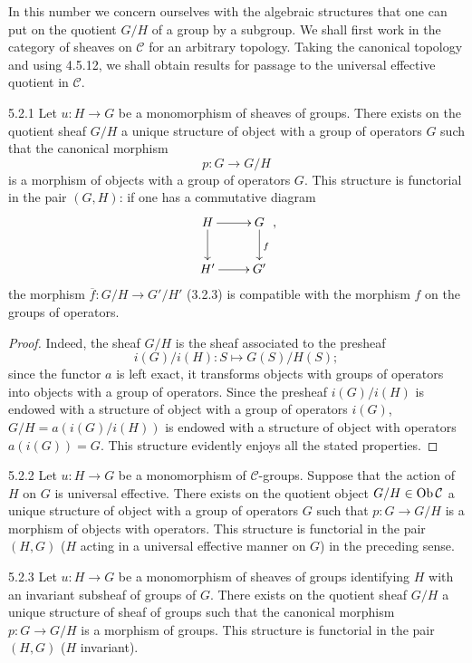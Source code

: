 In this number we concern ourselves with the algebraic
structures that one can put on the quotient \(G/H\)
of a group by a subgroup.
We shall first work in the category of sheaves on
\(\mathcal C\) for an arbitrary topology.
Taking the canonical topology and using 4.5.12,
we shall obtain results for passage to the universal
effective quotient in \(\mathcal C\).

\begin{proposition}{5.2.1}\label{IV.5.2.1}
Let \(u:H\to G\) be a monomorphism of sheaves of groups.
There exists on the quotient sheaf \(G/H\) a unique
structure of object with a group of operators \(G\)
such that the canonical morphism
\[
p:G\longrightarrow G/H
\]
is a morphism of objects with a group of operators \(G\).
This structure is functorial in the pair \((G,H)\):
if one has a commutative diagram
\[
\xymatrix{H\ar[r]\ar[d] & G\ar[d]^f\\ H'\ar[r] & G' },
\]
the morphism \(\overline f:G/H\to G'/H'\) (3.2.3)
is compatible with the morphism \(f\) on the groups
of operators.
\end{proposition}
\begin{proof}
Indeed, the sheaf \(G/H\) is the sheaf associated to the presheaf
\[
i(G)/i(H):S\longmapsto G(S)/H(S);
\]
since the functor \(a\) is left exact, it transforms
objects with groups of operators into objects with
a group of operators.
Since the presheaf \(i(G)/i(H)\) is endowed with a
structure of object with a group of operators \(i(G)\),
\(G/H=a(i(G)/i(H))\) is endowed with a structure of
object with operators \(a(i(G))=G\).
This structure evidently enjoys all the stated properties.
\end{proof}
\begin{corollary}{5.2.2}\label{IV.5.2.2}
Let \(u:H\to G\) be a monomorphism of \(\mathcal C\)-groups.
Suppose that the action of \(H\) on \(G\) is universal
effective. There exists on the quotient object
\(G/H\in\operatorname{Ob}\mathcal C\) a unique structure of object
with a group of operators \(G\) such that \(p:G\to G/H\)
is a morphism of objects with operators.
This structure is functorial in the pair \((H,G)\)
(\(H\) acting in a universal effective manner on \(G\))
in the preceding sense.
\end{corollary}
\begin{proposition}{5.2.3}\label{IV.5.2.3}
Let \(u:H\to G\) be a monomorphism of sheaves of groups
identifying \(H\) with an invariant subsheaf of groups
of \(G\). There exists on the quotient sheaf \(G/H\)
a unique structure of sheaf of groups such that
the canonical morphism \(p:G\to G/H\) is a morphism
of groups. This structure is functorial in the pair
\((H,G)\) (\(H\) invariant).
\end{proposition}
